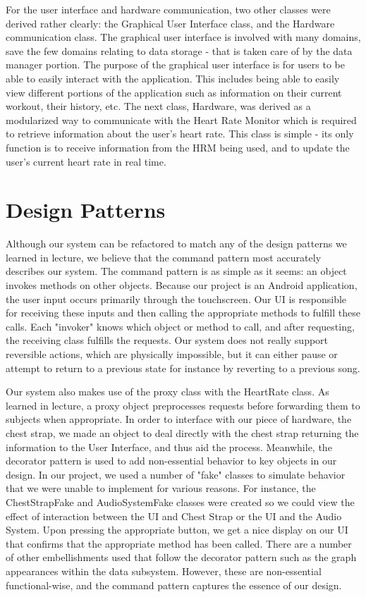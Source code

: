 \documentclass[letterpaper,english, 12pt]{scrreprt}
\begin{document}
    For the user interface and hardware communication, two other classes were derived rather clearly: the Graphical User Interface class, and the Hardware communication class. The graphical user interface is involved with many domains, save the few domains relating to data storage - that is taken care of by the data manager portion. The purpose of the graphical user interface is for users to be able to easily interact with the application. This includes being able to easily view different portions of the application such as information on their current workout, their history, etc. The next class, Hardware, was derived as a modularized way to communicate with the Heart Rate Monitor which is required to retrieve information about the user's heart rate. This class is simple - its only function is to receive information from the HRM being used, and to update the user's current heart rate in real time.

\section{Design Patterns}

	Although our system can be refactored to match any of the design patterns we learned in lecture, we believe that the command pattern most accurately describes our system. The command pattern is as simple as it seems: an object invokes methods on other objects. Because our project is an Android application, the user input occurs primarily through the touchscreen. Our UI is responsible for receiving these inputs and then calling the appropriate methods to fulfill these calls. Each "invoker" knows which object or method to call, and after requesting, the receiving class fulfills the requests. Our system does not really support reversible actions, which are physically impossible, but it can either pause or attempt to return to a previous state for instance by reverting to a previous song. 

	Our system also makes use of the proxy class with the HeartRate class. As learned in lecture, a proxy object preprocesses requests before forwarding them to subjects when appropriate. In order to interface with our piece of hardware, the chest strap, we made an object to deal directly with the chest strap returning the information to the User Interface, and thus aid the process.  
Meanwhile, the decorator pattern is used to add non-essential behavior to key objects in our design. In our project, we used a number of "fake" classes to simulate behavior that we were unable to implement for various reasons. For instance, the ChestStrapFake and AudioSystemFake classes were created so we could view the effect of interaction between the UI and Chest Strap or the UI and the Audio System. Upon pressing the appropriate button, we get a nice display on our UI that confirms that the appropriate method has been called. There are a number of other embellishments used that follow the decorator pattern such as the graph appearances within the data subsystem. However, these are non-essential functional-wise, and the command pattern captures the essence of our design.
\end{document}
